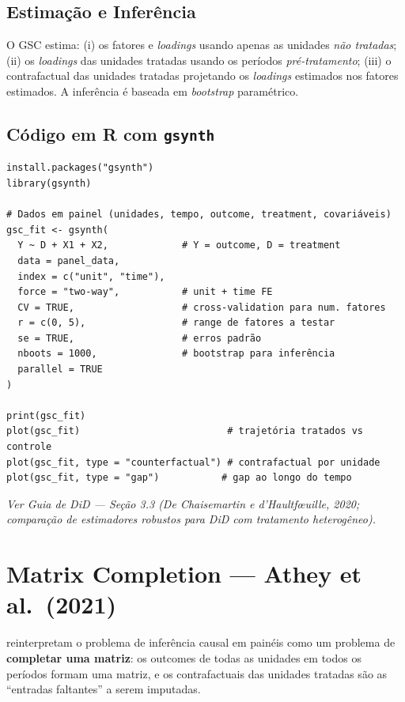 \documentclass[12pt, a4paper, openany]{book}
\begin{document}
\subsection{Estimação e Inferência}

O GSC estima: (i) os fatores e \textit{loadings} usando apenas as unidades \textit{não tratadas}; (ii) os \textit{loadings} das unidades tratadas usando os períodos \textit{pré-tratamento}; (iii) o contrafactual das unidades tratadas projetando os \textit{loadings} estimados nos fatores estimados. A inferência é baseada em \textit{bootstrap} paramétrico.

\subsection{Código em R com \texttt{gsynth}}

\begin{lstlisting}[style=Rstyle]
install.packages("gsynth")
library(gsynth)

# Dados em painel (unidades, tempo, outcome, treatment, covariáveis)
gsc_fit <- gsynth(
  Y ~ D + X1 + X2,             # Y = outcome, D = treatment
  data = panel_data,
  index = c("unit", "time"),
  force = "two-way",           # unit + time FE
  CV = TRUE,                   # cross-validation para num. fatores
  r = c(0, 5),                 # range de fatores a testar
  se = TRUE,                   # erros padrão
  nboots = 1000,               # bootstrap para inferência
  parallel = TRUE
)

print(gsc_fit)
plot(gsc_fit)                          # trajetória tratados vs controle
plot(gsc_fit, type = "counterfactual") # contrafactual por unidade
plot(gsc_fit, type = "gap")           # gap ao longo do tempo
\end{lstlisting}

\begin{conexaobox}
\textit{Ver Guia de DiD --- Seção 3.3 (De Chaisemartin e d'Haultfœuille, 2020; comparação de estimadores robustos para DiD com tratamento heterogêneo).}
\end{conexaobox}


\section{Matrix Completion --- Athey et al.\ (2021)}

\cite{AtheyEtAl2021} reinterpretam o problema de inferência causal em painéis como um problema de \textbf{completar uma matriz}: os outcomes de todas as unidades em todos os períodos formam uma matriz, e os contrafactuais das unidades tratadas são as ``entradas faltantes'' a serem imputadas.
\end{document}
